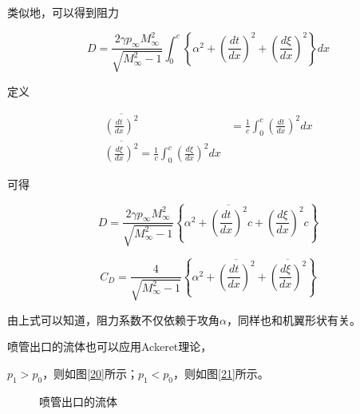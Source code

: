 类似地，可以得到阻力

\begin{equation*}
    D=\frac{2 \gamma p_{\infty} M_{\infty}^{2}}{\sqrt{M_{\infty}^{2}-1}} \int_{0}^{c}\left\{\alpha^{2}+\left(\frac{d t}{d x}\right)^{2}+\left(\frac{d \xi}{d x}\right)^{2}\right\} d x
\end{equation*}

定义

\begin{align*}
    \overline{\left(\frac{d t}{d x}\right)^{2}}&=\frac{1}{c} \int_{0}^{c}\left(\frac{d t}{d x}\right)^{2} d x\\ 
    \overline{\left(\frac{d \xi}{d x}\right)^{2}}=\frac{1}{c} \int_{0}^{c}\left(\frac{d \xi}{d x}\right)^{2} d x
\end{align*}

可得

\begin{equation*}
    D=\frac{2 \gamma p_{\infty} M_{\infty}^{2}}{\sqrt{M_{\infty}^{2}-1}}\left\{\alpha^{2}+\overline{\left(\frac{d t}{d x}\right)^{2}} c+\left(\frac{d \xi}{d x}\right)^{2} c\right\}
\end{equation*}

\begin{equation*}
    C_{D}=\frac{4}{\sqrt{M_{\infty}^{2}-1}}\left\{\alpha^{2}+\overline{\left(\frac{d t}{d x}\right)^{2}}+\overline{\left(\frac{d \xi}{d x}\right)^{2}}\right\}
\end{equation*}

由上式可以知道，阻力系数不仅依赖于攻角$\alpha$，同样也和机翼形状有关。

喷管出口的流体也可以应用Ackeret理论，

$p_1>p_0$，则如图\ref{20}所示；$p_1<p_0$，则如图\ref{21}所示。

\begin{figure}[!htb]
    \centering
    \quad
    \caption{喷管出口的流体}
\end{figure}




